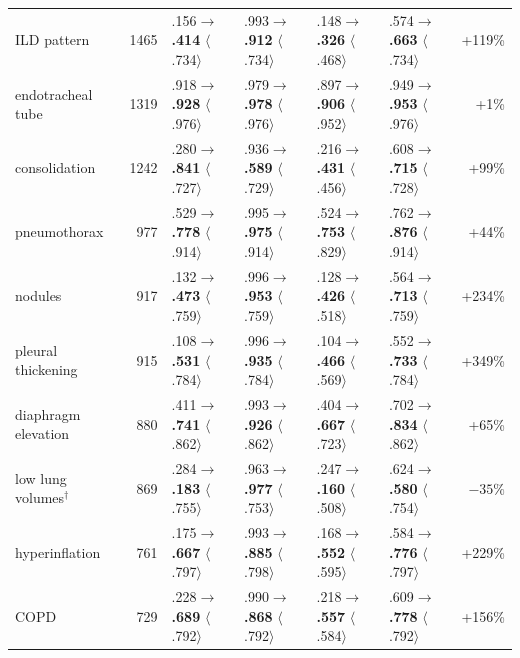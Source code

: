 \documentclass[10pt,a4paper]{article}
\begin{document}
\begin{table}[h]
\begin{tabular}{lrllllr}
ILD pattern & 1465 & .156$\to$\textbf{.414} $\langle$.734$\rangle$ & .993$\to$\textbf{.912} $\langle$.734$\rangle$ & .148$\to$\textbf{.326} $\langle$.468$\rangle$ & .574$\to$\textbf{.663} $\langle$.734$\rangle$ & +119\% \\
endotracheal tube & 1319 & .918$\to$\textbf{.928} $\langle$.976$\rangle$ & .979$\to$\textbf{.978} $\langle$.976$\rangle$ & .897$\to$\textbf{.906} $\langle$.952$\rangle$ & .949$\to$\textbf{.953} $\langle$.976$\rangle$ & +1\% \\
consolidation & 1242 & .280$\to$\textbf{.841} $\langle$.727$\rangle$ & .936$\to$\textbf{.589} $\langle$.729$\rangle$ & .216$\to$\textbf{.431} $\langle$.456$\rangle$ & .608$\to$\textbf{.715} $\langle$.728$\rangle$ & +99\% \\
pneumothorax & 977 & .529$\to$\textbf{.778} $\langle$.914$\rangle$ & .995$\to$\textbf{.975} $\langle$.914$\rangle$ & .524$\to$\textbf{.753} $\langle$.829$\rangle$ & .762$\to$\textbf{.876} $\langle$.914$\rangle$ & +44\% \\
nodules & 917 & .132$\to$\textbf{.473} $\langle$.759$\rangle$ & .996$\to$\textbf{.953} $\langle$.759$\rangle$ & .128$\to$\textbf{.426} $\langle$.518$\rangle$ & .564$\to$\textbf{.713} $\langle$.759$\rangle$ & +234\% \\
pleural thickening & 915 & .108$\to$\textbf{.531} $\langle$.784$\rangle$ & .996$\to$\textbf{.935} $\langle$.784$\rangle$ & .104$\to$\textbf{.466} $\langle$.569$\rangle$ & .552$\to$\textbf{.733} $\langle$.784$\rangle$ & +349\% \\
diaphragm elevation & 880 & .411$\to$\textbf{.741} $\langle$.862$\rangle$ & .993$\to$\textbf{.926} $\langle$.862$\rangle$ & .404$\to$\textbf{.667} $\langle$.723$\rangle$ & .702$\to$\textbf{.834} $\langle$.862$\rangle$ & +65\% \\
low lung volumes$^{\dagger}$ & 869 & .284$\to$\textbf{.183} $\langle$.755$\rangle$ & .963$\to$\textbf{.977} $\langle$.753$\rangle$ & .247$\to$\textbf{.160} $\langle$.508$\rangle$ & .624$\to$\textbf{.580} $\langle$.754$\rangle$ & $-35\%$ \\
hyperinflation & 761 & .175$\to$\textbf{.667} $\langle$.797$\rangle$ & .993$\to$\textbf{.885} $\langle$.798$\rangle$ & .168$\to$\textbf{.552} $\langle$.595$\rangle$ & .584$\to$\textbf{.776} $\langle$.797$\rangle$ & +229\% \\
COPD & 729 & .228$\to$\textbf{.689} $\langle$.792$\rangle$ & .990$\to$\textbf{.868} $\langle$.792$\rangle$ & .218$\to$\textbf{.557} $\langle$.584$\rangle$ & .609$\to$\textbf{.778} $\langle$.792$\rangle$ & +156\% \\

\end{tabular}
\end{table}
\end{document}
